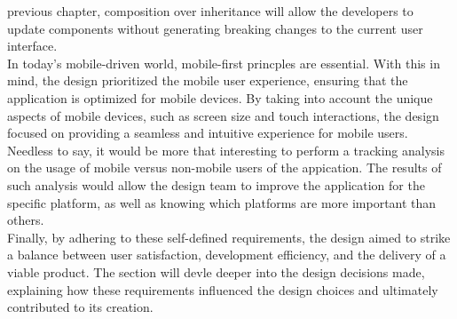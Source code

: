 \documentclass[./memory.tex]{subfiles}
\begin{document}
previous chapter, composition over inheritance will allow the developers to
update components without generating breaking changes to the current user
interface.
\\
In today's mobile-driven world, mobile-first princples are essential. With this
in mind, the design prioritized the mobile user experience, ensuring that the
application is optimized for mobile devices. By taking into account the unique
aspects of mobile devices, such as screen size and touch interactions, the
design focused on providing a seamless and intuitive experience for mobile
users. Needless to say, it would be more that interesting to perform a tracking
analysis on the usage of mobile versus non-mobile users of the appication. The
results of such analysis would allow the design team to improve the application
for the specific platform, as well as knowing which platforms are more important
than others.
\\[8pt]
Finally, by adhering to these self-defined requirements, the design aimed to
strike a balance between user satisfaction, development efficiency, and the
delivery of a viable product. The section will devle deeper into the design
decisions made, explaining how these requirements influenced the design choices
and ultimately contributed to its creation.
\end{document}
